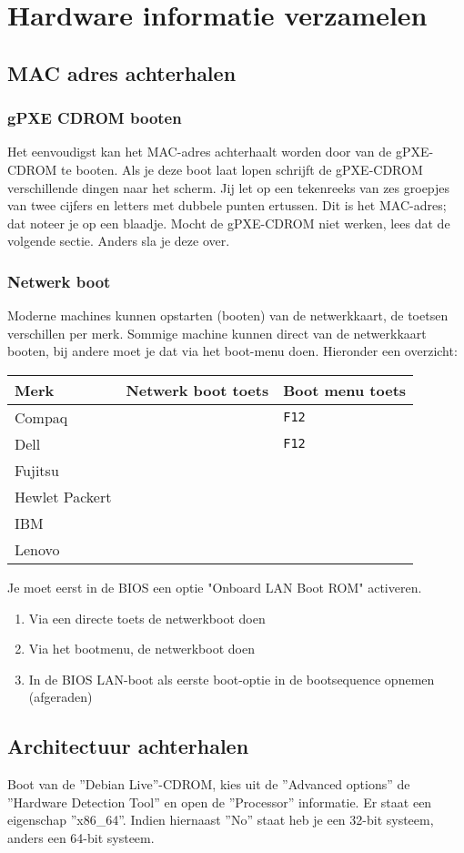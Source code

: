 \section{Hardware informatie verzamelen}
\subsection{MAC adres achterhalen}
\subsubsection{gPXE CDROM booten}
Het eenvoudigst kan het MAC-adres achterhaalt worden door van de gPXE-CDROM te booten. Als je deze boot laat lopen schrijft de gPXE-CDROM verschillende dingen naar het scherm. Jij let op een tekenreeks van zes groepjes van twee cijfers en letters met dubbele punten ertussen. Dit is het MAC-adres; dat noteer je op een blaadje. Mocht de gPXE-CDROM niet werken, lees dat de volgende sectie. Anders sla je deze over.
\subsubsection{Netwerk boot}
Moderne machines kunnen opstarten (booten) van de netwerkkaart, de toetsen verschillen per merk. Sommige machine kunnen direct van de netwerkkaart booten, bij andere moet je dat via het boot-menu doen. Hieronder een overzicht:
\begin{table}[H]
	\begin{tabular}{| l | l |  l |}
	\hline 
	\textbf{Merk} & \textbf{Netwerk boot toets} & \textbf{Boot menu toets}\\
	\hline
	Compaq &  & \texttt{F12}\\
	\hline
	Dell &  & \texttt{F12} \\
	\hline
	Fujitsu &  & \\
	\hline
	Hewlet Packert &   & \\
	\hline
	IBM &   & \\
	\hline
	Lenovo &  &  \\
	\hline
\end{tabular}
\end{table}
Je moet eerst in de BIOS een optie "Onboard LAN Boot ROM" activeren.
\begin{enumerate}
	\item{Via een directe toets de netwerkboot doen}
	\item{Via het bootmenu, de netwerkboot doen}
	\item{In de BIOS LAN-boot als eerste boot-optie in de bootsequence opnemen (afgeraden)}
\end{enumerate}
\subsection{Architectuur achterhalen}
Boot van de ''Debian Live''-CDROM, kies uit de ''Advanced options'' de ''Hardware Detection Tool'' en open de ''Processor'' informatie.
Er staat een eigenschap ''x86\_64''. Indien hiernaast ''No'' staat heb je een 32-bit systeem, anders een 64-bit systeem.

